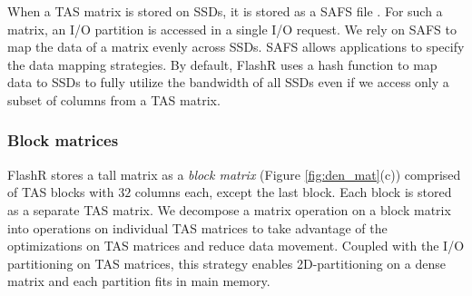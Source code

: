 When a TAS matrix is stored on SSDs, it is stored as a SAFS file \cite{safs}.
For such a matrix, an I/O partition is accessed in a single I/O request.
We rely on SAFS to map the data of a matrix evenly across SSDs. SAFS allows
applications to specify the data mapping strategies. By default, FlashR uses
a hash function to map data to SSDs to fully utilize the bandwidth of all SSDs
even if we access only a subset of columns from a TAS matrix.

\subsubsection{Block matrices} \label{sec:block_mat}
FlashR stores a tall matrix as a \textit{block matrix}
(Figure \ref{fig:den_mat}(c)) comprised of TAS blocks with $32$ columns each,
except the last block. Each block is stored as a separate TAS matrix.
We decompose a matrix operation
on a block matrix into operations on individual TAS matrices to take advantage
of the optimizations on TAS matrices and reduce data movement.
Coupled with the I/O partitioning on TAS matrices, this strategy enables
2D-partitioning on a dense matrix and each partition fits in main memory.



